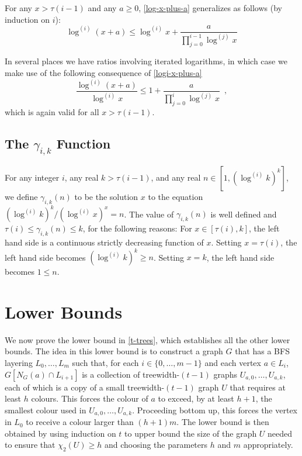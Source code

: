 \documentclass[kpfonts]{patmorin}
\newcommand{\trn}{\chi_2}
\theoremstyle{named}
\begin{document}
For any $x > \tau(i-1)$ and any $a\ge 0$, \cref{log-x-plus-a} generalizes as follows (by induction on $i$):
\begin{equation}
    \log^{(i)}(x+a) \le \log^{(i)} x + \frac{a}{\prod_{j=0}^{i-1}\log^{(j)} x} \label{logi-x-plus-a}
\end{equation}

In several places we have ratios involving iterated logarithms, in which case we make use of the following consequence of \cref{logi-x-plus-a}
\begin{equation}
    \frac{\log^{(i)} (x+a)}{\log^{(i)} x} \le 1 + \frac{a}{\prod_{j=0}^{i}\log^{(j)} x} \enspace, \label{logi-ratio}
\end{equation}
which is again valid for all $x> \tau(i-1)$.

\subsection{The $\gamma_{i,k}$ Function}


For any integer $i$, any real $k>\tau(i-1)$, and any real $n\in[1,(\log^{(i)} k)^k]$, we define $\gamma_{i,k}(n)$ to be the solution $x$ to the equation $(\log^{(i)} k)^k/(\log^{(i)} x)^{x}=n$.  The value of $\gamma_{i,k}(n)$ is well defined and $\tau(i)\le \gamma_{i,k}(n)\le k$, for the following reasons:  For $x\in[\tau(i),k]$, the left hand side is a continuous strictly decreasing function of $x$. Setting $x=\tau(i)$, the left hand side becomes $(\log^{(i)} k)^k \ge n$. Setting $x=k$, the left hand side becomes $1\le n$.


\section{Lower Bounds}
\label{lower-bounds}

We now prove the lower bound in \cref{t-trees}, which establishes all the other lower bounds. The idea in this lower bound is to construct a graph $G$ that has a BFS layering $L_0,\ldots,L_m$ such that, for each $i\in\{0,\ldots,m-1\}$ and each vertex $a\in L_i$, $G[N_G(a)\cap L_{i+1}]$ is a collection of treewidth-$(t-1)$ graphs $U_{a,0},\ldots,U_{a,k}$, each of which is a copy of a small treewidth-$(t-1)$ graph $U$ that requires at least $h$ colours.  This forces the colour of $a$ to exceed, by at least $h+1$, the smallest colour used in $U_{a,0},\ldots,U_{a,k}$.  Proceeding bottom up, this forces the vertex in $L_0$ to receive a colour larger than $(h+1)m$.  The lower bound is then obtained by using induction on $t$ to upper bound the size of the graph $U$ needed to ensure that $\trn(U)\ge h$ and choosing the parameters $h$ and $m$ appropriately.
\end{document}
